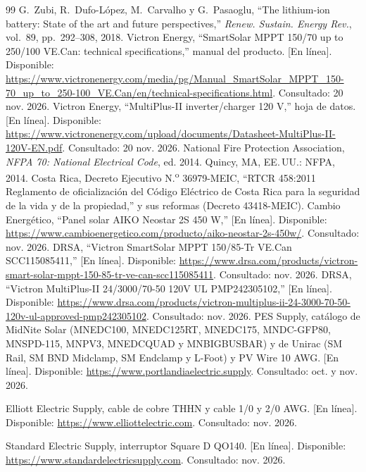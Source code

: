 \begin{thebibliography}{99}
 G.~Zubi, R.~Dufo-López, M.~Carvalho y G.~Pasaoglu, ``The lithium-ion battery: State of the art and future perspectives,'' \emph{Renew. Sustain. Energy Rev.}, vol.~89, pp.~292--308, 2018.
 Victron Energy, ``SmartSolar MPPT 150/70 up to 250/100 VE.Can: technical specifications,'' manual del producto. [En línea]. Disponible: \url{https://www.victronenergy.com/media/pg/Manual_SmartSolar_MPPT_150-70_up_to_250-100_VE.Can/en/technical-specifications.html}. Consultado: 20 nov. 2026.
 Victron Energy, ``MultiPlus-II inverter/charger 120 V,'' hoja de datos. [En línea]. Disponible: \url{https://www.victronenergy.com/upload/documents/Datasheet-MultiPlus-II-120V-EN.pdf}. Consultado: 20 nov. 2026.
 National Fire Protection Association, \textit{NFPA 70: National Electrical Code}, ed. 2014. Quincy, MA, EE.\,UU.: NFPA, 2014.
 Costa Rica, Decreto Ejecutivo N.\textsuperscript{o} 36979-MEIC, ``RTCR 458:2011 Reglamento de oficialización del Código Eléctrico de Costa Rica para la seguridad de la vida y de la propiedad,'' y sus reformas (Decreto 43418-MEIC).
 Cambio Energético, ``Panel solar AIKO Neostar 2S 450 W,'' [En línea]. Disponible: \url{https://www.cambioenergetico.com/producto/aiko-neostar-2s-450w/}. Consultado: nov. 2026.
 DRSA, ``Victron SmartSolar MPPT 150/85-Tr VE.Can SCC115085411,'' [En línea]. Disponible: \url{https://www.drsa.com/products/victron-smart-solar-mppt-150-85-tr-ve-can-scc115085411}. Consultado: nov. 2026.
 DRSA, ``Victron MultiPlus-II 24/3000/70-50 120V UL PMP242305102,'' [En línea]. Disponible: \url{https://www.drsa.com/products/victron-multiplus-ii-24-3000-70-50-120v-ul-approved-pmp242305102}. Consultado: nov. 2026.
 PES Supply, catálogo de MidNite Solar (MNEDC100, MNEDC125RT, MNEDC175, MNDC-GFP80, MNSPD-115, MNPV3, MNEDCQUAD y MNBIGBUSBAR) y de Unirac (SM Rail, SM BND Midclamp, SM Endclamp y L-Foot) y PV Wire 10 AWG. [En línea]. Disponible: \url{https://www.portlandiaelectric.supply}. Consultado: oct. y nov. 2026.

 Elliott Electric Supply, cable de cobre THHN y cable 1/0 y 2/0 AWG. [En línea]. Disponible: \url{https://www.elliottelectric.com}. Consultado: nov. 2026.

 Standard Electric Supply, interruptor Square D QO140. [En línea]. Disponible: \url{https://www.standardelectricsupply.com}. Consultado: nov. 2026.


\end{thebibliography}
